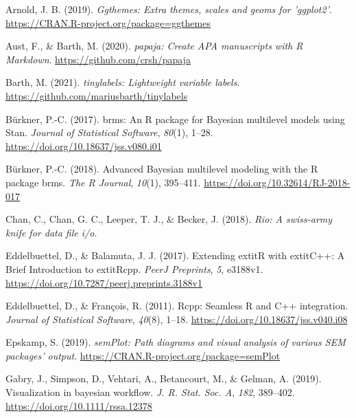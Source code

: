 \documentclass[
  man]{apa6}
\newlength{\cslhangindent}
\newlength{\cslentryspacingunit} %
\newenvironment{CSLReferences}[2] %
 {%
  \setlength{\parindent}{0pt}
  \ifodd #1
  \let\oldpar\par
  \def\par{\hangindent=\cslhangindent\oldpar}
  \fi
  \setlength{\parskip}{#2\cslentryspacingunit}
 }%
 {}
\begin{document}
\begin{CSLReferences}{1}{0}
\leavevmode{}%
Arnold, J. B. (2019). \emph{Ggthemes: Extra themes, scales and geoms for 'ggplot2'}. \url{https://CRAN.R-project.org/package=ggthemes}

\leavevmode{}%
Aust, F., \& Barth, M. (2020). \emph{{papaja}: {Create} {APA} manuscripts with {R Markdown}}. \url{https://github.com/crsh/papaja}

\leavevmode{}%
Barth, M. (2021). \emph{{tinylabels}: Lightweight variable labels}. \url{https://github.com/mariusbarth/tinylabels}

\leavevmode{}%
Bürkner, P.-C. (2017). {brms}: An {R} package for {Bayesian} multilevel models using {Stan}. \emph{Journal of Statistical Software}, \emph{80}(1), 1--28. \url{https://doi.org/10.18637/jss.v080.i01}

\leavevmode{}%
Bürkner, P.-C. (2018). Advanced {Bayesian} multilevel modeling with the {R} package {brms}. \emph{The R Journal}, \emph{10}(1), 395--411. \url{https://doi.org/10.32614/RJ-2018-017}

\leavevmode{}%
Chan, C., Chan, G. C., Leeper, T. J., \& Becker, J. (2018). \emph{Rio: A swiss-army knife for data file i/o}.

\leavevmode{}%
Eddelbuettel, D., \& Balamuta, J. J. (2017). {Extending extit{R} with extit{C++}: A Brief Introduction to extit{Rcpp}}. \emph{PeerJ Preprints}, \emph{5}, e3188v1. \url{https://doi.org/10.7287/peerj.preprints.3188v1}

\leavevmode{}%
Eddelbuettel, D., \& François, R. (2011). {Rcpp}: Seamless {R} and {C++} integration. \emph{Journal of Statistical Software}, \emph{40}(8), 1--18. \url{https://doi.org/10.18637/jss.v040.i08}

\leavevmode{}%
Epskamp, S. (2019). \emph{semPlot: Path diagrams and visual analysis of various SEM packages' output}. \url{https://CRAN.R-project.org/package=semPlot}

\leavevmode{}%
Gabry, J., Simpson, D., Vehtari, A., Betancourt, M., \& Gelman, A. (2019). Visualization in bayesian workflow. \emph{J. R. Stat. Soc. A}, \emph{182}, 389--402. \url{https://doi.org/10.1111/rssa.12378}


\end{CSLReferences}
\end{document}
